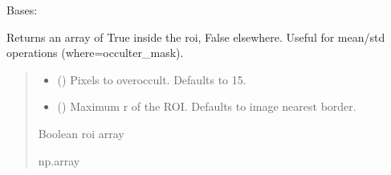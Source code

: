 \documentclass[letterpaper,10pt,english]{sphinxmanual}
\begin{document}
\begin{fulllineitems}
\label{\detokenize{micropolarray:micropolarray.cameras.Camera}}
\pysigstartsignatures
{}
\pysigstopsignatures
\sphinxAtStartPar
Bases: 

\begin{fulllineitems}
\label{\detokenize{micropolarray:micropolarray.cameras.Camera.occulter_mask}}
\pysigstartsignatures
{}
\pysigstopsignatures
\sphinxAtStartPar
Returns an array of True inside the roi, False elsewhere. Useful for mean/std operations (where=occulter\_mask).
\begin{quote}\begin{description}
\begin{itemize}
\item {} 
\sphinxAtStartPar
{} (\sphinxstyleliteralemphasis{\sphinxupquote{, }}) \textendash{} Pixels to overoccult. Defaults to 15.

\item {} 
\sphinxAtStartPar
{} (\sphinxstyleliteralemphasis{\sphinxupquote{, }}) \textendash{} Maximum r of the ROI. Defaults to image nearest border.

\end{itemize}

\sphinxAtStartPar
Boolean roi array

\sphinxAtStartPar
np.array


\end{description}
\end{quote}
\end{fulllineitems}
\end{fulllineitems}
\end{document}
